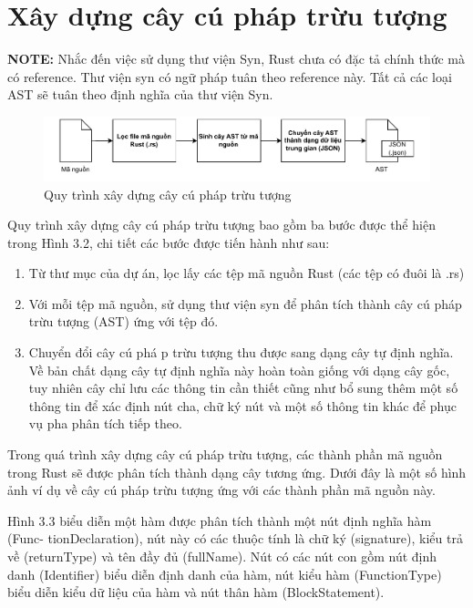 \section{Xây dựng cây cú pháp trừu tượng}

\textbf{NOTE:} Nhắc đến việc sử dụng thư viện Syn, Rust chưa có đặc tả chính thức mà có reference. Thư viện syn có ngữ pháp tuân theo reference này. Tất cả các loại AST sẽ tuân theo định nghĩa của thư viện Syn.

\begin{figure}[H]
	\includegraphics[width=1\columnwidth]{figures/c3/c3_flow_ast.drawio.pdf}
	\centering
	\caption{Quy trình xây dựng cây cú pháp trừu tượng}
	\label{img:method_flow_ast}
\end{figure}

Quy trình xây dựng cây cú pháp trừu tượng bao gồm ba bước được thể hiện trong
Hình 3.2, chi tiết các bước được tiến hành như sau:

\begin{enumerate}
  \item Từ thư mục của dự án, lọc lấy các tệp mã nguồn Rust (các tệp có đuôi là .rs)
  \item Với mỗi tệp mã nguồn, sử dụng thư viện syn để phân tích thành cây cú pháp trừu tượng (AST) ứng với tệp đó.
  \item Chuyển đổi cây cú phá p trừu tượng thu được sang dạng cây tự định nghĩa. Về bản chất dạng cây tự định nghĩa này hoàn toàn giống với dạng cây gốc, tuy nhiên cây chỉ lưu các thông tin cần thiết cũng như bổ sung thêm một số thông tin để xác định nút cha, chữ ký nút và một số thông tin khác để phục vụ pha phân tích tiếp theo.
\end{enumerate}

Trong quá trình xây dựng cây cú pháp trừu tượng, các thành phần mã nguồn trong
Rust sẽ được phân tích thành dạng cây tương ứng. Dưới đây là một số hình ảnh ví dụ về
cây cú pháp trừu tượng ứng với các thành phần mã nguồn này.

Hình 3.3 biểu diễn một hàm được phân tích thành một nút định nghĩa hàm (Func-
tionDeclaration), nút này có các thuộc tính là chữ ký (signature), kiểu trả về (returnType)
và tên đầy đủ (fullName). Nút có các nút con gồm nút định danh (Identifier) biểu diễn
định danh của hàm, nút kiểu hàm (FunctionType) biểu diễn kiểu dữ liệu của hàm và nút
thân hàm (BlockStatement).

